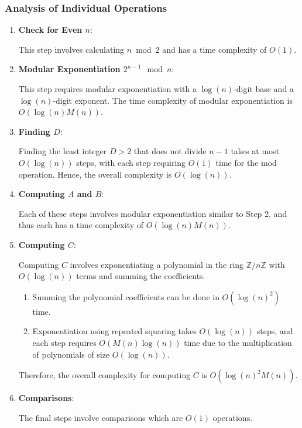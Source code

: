 \documentclass{article}
\theoremstyle{plain}
\theoremstyle{definition}
\begin{document}
\subsubsection{Analysis of Individual Operations}
\begin{enumerate}
    \item \textbf{Check for Even \( n \)}:
    
        This step involves calculating $n \bmod{2}$ and has a time complexity of \( O(1) \).

    \item \textbf{Modular Exponentiation \( 2^{n-1} \mod n \)}:
    
        This step requires modular exponentiation with a \( \log(n) \)-digit base and a \( \log(n) \)-digit exponent. The time complexity of modular exponentiation is \( O(\log(n) M(n)) \).

    \item \textbf{Finding \( D \)}:
    
        Finding the least integer \( D > 2 \) that does not divide \( n-1 \) takes at most \( O(\log(n)) \) steps, with each step requiring \( O(1) \) time for the mod operation. Hence, the overall complexity is \( O(\log(n)) \).

    \item \textbf{Computing \( A \) and \( B \)}:
    
        Each of these steps involves modular exponentiation similar to Step 2, and thus each has a time complexity of \( O(\log(n) M(n)) \).

    \item \textbf{Computing \( C \)}:
    
        Computing \( C \) involves exponentiating a polynomial in the ring \(\mathbb{Z}/n\mathbb{Z}\) with \( O(\log(n)) \) terms and summing the coefficients.
        \begin{enumerate}
            \item Summing the polynomial coefficients can be done in \( O(\log(n)^2) \) time.
            \item Exponentiation using repeated squaring takes \( O(\log(n)) \) steps, and each step requires \( O(M(n)\log(n)) \) time due to the multiplication of polynomials of size \( O(\log(n)) \).
        \end{enumerate}
         Therefore, the overall complexity for computing \( C \) is \( O(\log(n)^2 M(n)) \).

    \item \textbf{Comparisons}:
    
        The final steps involve comparisons which are \( O(1) \) operations.
\end{enumerate}
\end{document}
